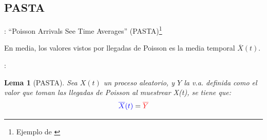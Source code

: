 \documentclass{beamer}
\newtheorem{lema}{Lema}[section]
\newcommand{\red}[1]{{\color{red}#1}}
\newcommand{\blue}[1]{{\color{blue}#1}}
\begin{document}
\subsection{PASTA}
\begin{frame}{\secname: \subsecname}
    ``Poisson Arrivals See Time Averages'' (PASTA)\footnote{Ejemplo de \cite[Figura 3.17]{amable}}

    \vfill

    \begin{figure}
        
    \end{figure}

    En media, los \blue{valores} vistos por
    {\color{Firebrick1}llegadas} de Poisson
    es la media temporal $\overline{X}(t)$.

\end{frame}



\begin{frame}{\secname: \subsecname}
    \begin{lema}[PASTA]
        Sea \blue{$X(t)$} un proceso aleatorio,
        y \red{$Y$} la v.a. definida como el
        valor que toman las llegadas de Poisson
        al muestrear \blue{X(t)}, se tiene que:
        \begin{equation}
            \blue{\overline{X}(t)} = \red{\overline{Y}}
        \end{equation}
    \end{lema}
\end{frame}
\end{document}
